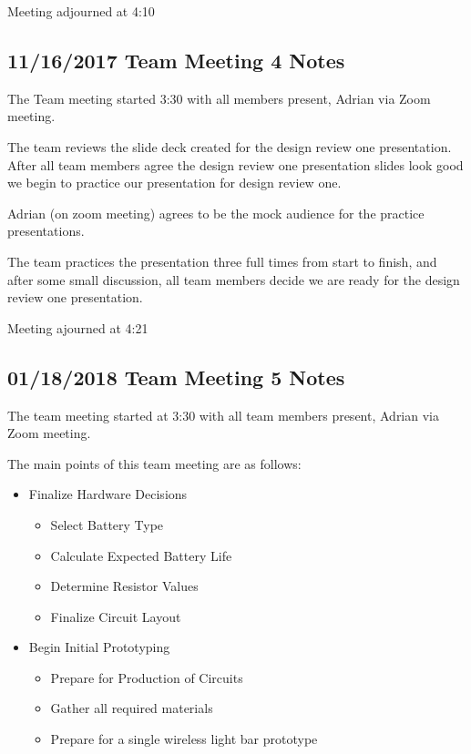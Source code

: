 \documentclass[12pt]{article}
\begin{document}
Meeting adjourned at 4:10

\clearpage

	\subsection{11/16/2017 Team Meeting 4 Notes}
	The Team meeting started 3:30 with all members present, Adrian via Zoom meeting.
	
	\noindent
	The team reviews the slide deck created for the design review one presentation. After all team members agree the design review one presentation slides look good we begin to practice our presentation for design review one.
	
	\noindent
	Adrian (on zoom meeting) agrees to be the mock audience for the practice presentations.
	
	\noindent
	The team practices the presentation three full times from start to finish, and 			after some small discussion, all team members decide we are ready for the design 		review one presentation. 
	
	Meeting ajourned at 4:21

\clearpage

	\subsection{01/18/2018 Team Meeting 5 Notes}
	The team meeting started at 3:30 with all team members present, Adrian via Zoom 		meeting.
	
	\noindent
	The main points of this team meeting are as follows:
	\begin{itemize}
	\item Finalize Hardware Decisions

		\begin{itemize}
		\item Select Battery Type
		\item Calculate Expected Battery Life
		\item Determine Resistor Values
		\item Finalize Circuit Layout
		\end{itemize}
		
	\item Begin Initial Prototyping
	
		\begin{itemize}
		\item Prepare for Production of Circuits
		\item Gather all required materials
		\item Prepare for a single wireless light bar prototype
		\end{itemize}
	
	\end{itemize}
	
\end{document}

